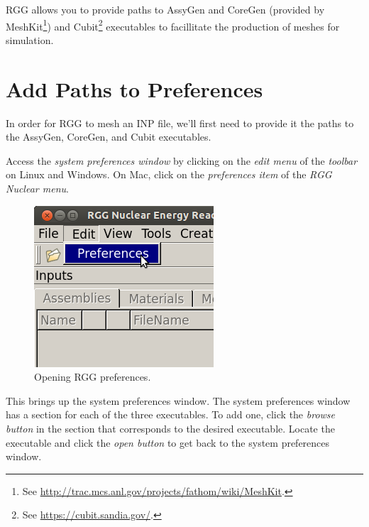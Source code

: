 RGG allows you to provide paths to AssyGen and CoreGen (provided by MeshKit\footnote{See \url{http://trac.mcs.anl.gov/projects/fathom/wiki/MeshKit}.}) and Cubit\footnote{See \url{https://cubit.sandia.gov/}.} executables to facillitate the production of meshes for simulation.

\section{Add Paths to Preferences}

In order for RGG to mesh an INP file, we'll first need to provide it the paths to the AssyGen, CoreGen, and Cubit executables.

Access the \emph{system preferences window} by clicking on the \emph{edit menu} of the \emph{toolbar} on Linux and Windows.  On Mac, click on the \emph{preferences item} of the \emph{RGG Nuclear menu}.

\begin{figure}[H]
	\begin{center}
		\includegraphics[width=0.5\linewidth]{Images/mesh-1.png}
		\caption{Opening RGG preferences.}
		\label{fig:Mesh1}
	\end{center}
\end{figure}

This brings up the system preferences window.  The system preferences window has a section for each of the three executables.  To add one, click the \emph{browse button} in the section that corresponds to the desired executable.  Locate the executable and click the \emph{open button} to get back to the system preferences window.

